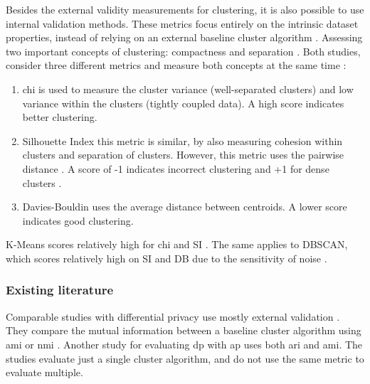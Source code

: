 Besides the external validity measurements for clustering, it is also possible to use internal validation methods.
These metrics focus entirely on the intrinsic dataset properties, instead of relying on an external baseline cluster algorithm \cite{craenendonck_using_nodate}.
Assessing two important concepts of clustering: compactness and separation \cite{hassani_using_2017}.
Both studies, consider three different metrics and measure both concepts at the same time \cite{hassani_using_2017}:
\begin{enumerate}
  \item \gls{chi} \citep{calinski_dendrite_1974-1} is used to measure the cluster variance (well-separated clusters) and low variance within the clusters (tightly coupled data). A high score indicates better clustering.
  \item Silhouette Index \citep{rousseeuw_silhouettes_1987} this metric is similar, by also measuring cohesion within clusters and separation of clusters. However, this metric uses the pairwise distance \cite{hassani_using_2017}. A score of -1 indicates incorrect clustering and +1 for dense clusters \cite{rousseeuw_silhouettes_1987}.
  \item Davies-Bouldin \citep{davies_cluster_1979} uses the average distance between centroids. A lower score indicates good clustering.
\end{enumerate}

K-Means scores relatively high for \gls{chi} \citep{craenendonck_using_nodate,hassani_using_2017} and SI \citep{craenendonck_using_nodate}.
The same applies to DBSCAN, which scores relatively high on SI and DB due to the sensitivity of noise \cite{craenendonck_using_nodate}.
\subsubsection{Existing literature}
Comparable studies with differential privacy use mostly external validation \citep{xia_distributed_2020-1, sun_privbv_2022}.
They compare the mutual information between a baseline cluster algorithm using \gls{ami} \citep{9679364} or \gls{nmi} \citep{xia_distributed_2020-1,sun_privbv_2022}.
Another study for evaluating \gls{dp} with \gls{ap} uses both \gls{ari} and \gls{ami}.
The studies evaluate just a single cluster algorithm, and do not use the same metric to evaluate multiple.


